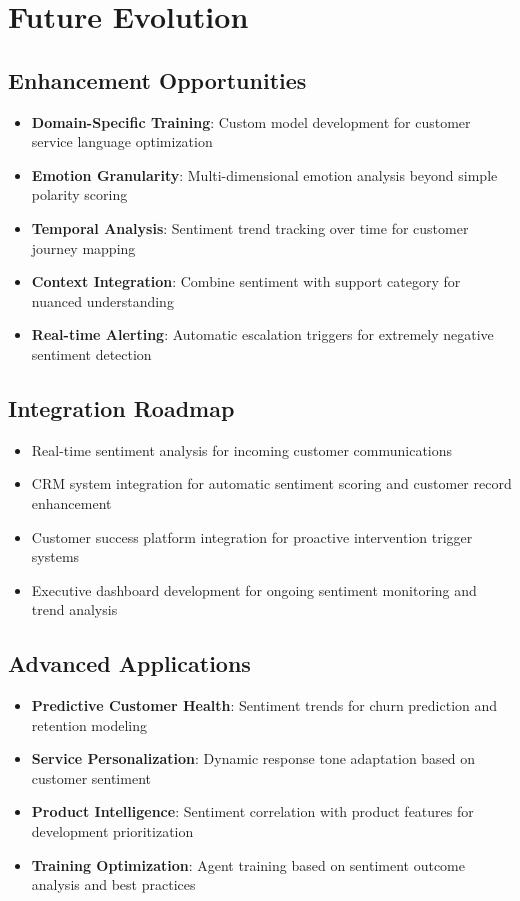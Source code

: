 \documentclass[11pt]{article}
\begin{document}
\section{Future Evolution}

\subsection{Enhancement Opportunities}
\begin{itemize}
\item \textbf{Domain-Specific Training}: Custom model development for customer service language optimization
\item \textbf{Emotion Granularity}: Multi-dimensional emotion analysis beyond simple polarity scoring
\item \textbf{Temporal Analysis}: Sentiment trend tracking over time for customer journey mapping
\item \textbf{Context Integration}: Combine sentiment with support category for nuanced understanding
\item \textbf{Real-time Alerting}: Automatic escalation triggers for extremely negative sentiment detection
\end{itemize}

\subsection{Integration Roadmap}
\begin{itemize}
\item Real-time sentiment analysis for incoming customer communications
\item CRM system integration for automatic sentiment scoring and customer record enhancement
\item Customer success platform integration for proactive intervention trigger systems
\item Executive dashboard development for ongoing sentiment monitoring and trend analysis
\end{itemize}

\subsection{Advanced Applications}
\begin{itemize}
\item \textbf{Predictive Customer Health}: Sentiment trends for churn prediction and retention modeling
\item \textbf{Service Personalization}: Dynamic response tone adaptation based on customer sentiment
\item \textbf{Product Intelligence}: Sentiment correlation with product features for development prioritization
\item \textbf{Training Optimization}: Agent training based on sentiment outcome analysis and best practices
\end{itemize}
\end{document}
